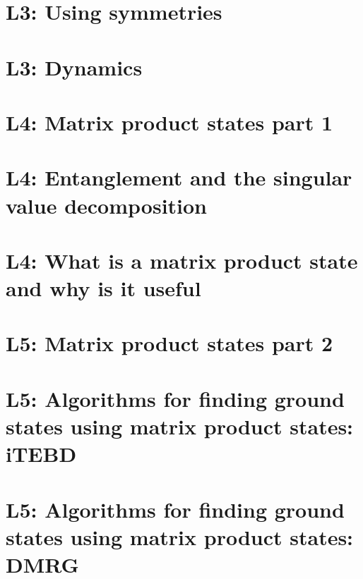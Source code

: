 \documentclass{book}
\theoremstyle{definition}
\begin{document}
\section{L3: Using symmetries}

\section{L3: Dynamics}


\newpage


\section{L4: Matrix product states part 1}




\section{L4: Entanglement and the singular value decomposition}



\section{L4: What is a matrix product state and why is it useful}
\newpage





\section{L5: Matrix product states part 2}




\section{L5: Algorithms for finding ground states using matrix product states: iTEBD }




\section{L5: Algorithms for finding ground states using matrix product states: DMRG}

\newpage
\end{document}
